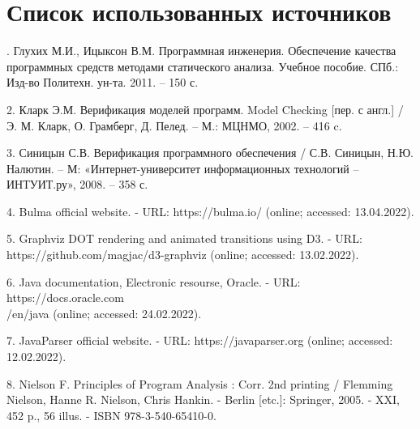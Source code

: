 \clearpage                                  %
\chapter*{Список использованных источников}
\label{references}
. Глухих М.И., Ицыксон В.М. Программная инженерия. Обеспечение качества программных средств методами статического анализа. Учебное пособие. СПб.: Изд-во Политехн. ун-та. 2011. – 150 с.

2. Кларк Э.М. Верификация моделей программ. Model Checking [пер. с англ.] / Э. М. Кларк, О. Грамберг, Д. Пелед. – М.: МЦНМО, 2002. – 416 c.

3. Синицын С.В. Верификация программного обеспечения / С.В. Синицын, Н.Ю. Налютин. – М: «Интернет-университет информационных технологий – ИНТУИТ.ру», 2008. – 358 с.

4. Bulma official website. - URL: https://bulma.io/ (online; accessed: 13.04.2022).

5. Graphviz DOT rendering and animated transitions using D3. - URL: https://github.com/magjac/d3-graphviz (online; accessed: 13.02.2022).

6. Java documentation, Electronic resourse, Oracle. - URL: https://docs.oracle.com\\/en/java (online; accessed: 24.02.2022).

7. JavaParser official website. - URL: https://javaparser.org (online; accessed: 12.02.2022).

8. Nielson F. Principles of Program Analysis : Corr. 2nd printing / Flemming Nielson, Hanne R. Nielson, Chris Hankin. - Berlin [etc.]: Springer, 2005. - XXI, 452 p., 56 illus. - ISBN 978-3-540-65410-0.

